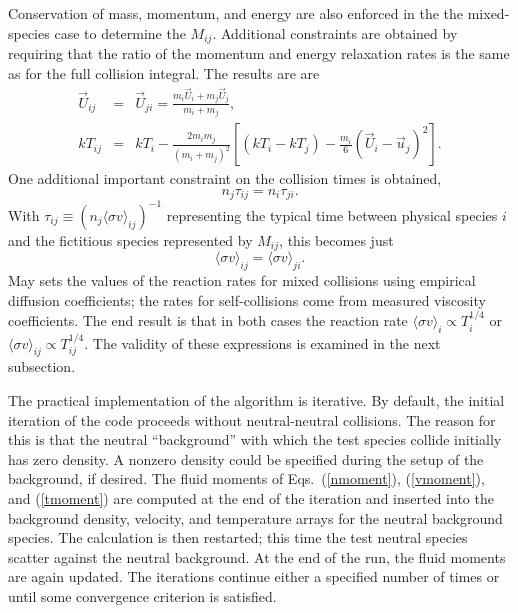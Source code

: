 \documentclass[12pt]{report}
\begin{document}
Conservation of mass, momentum, and energy are also enforced in the
the mixed-species case to determine the $M_{ij}$. Additional constraints
are obtained by requiring that the ratio of the momentum and energy
relaxation rates is the same as for the full collision integral.
The results are\cite{Mayxx,Reit97,Kanz99} are
\begin{eqnarray}
\vec{U}_{ij} & = & \vec{U}_{ji} = \frac{m_{i} \vec{U}_{i} + m_{j} \vec{U}_{j}}
{m_{i} + m_{j}}, \\
k T_{ij} & = & k T_{i}  - \frac{2 m_{i} m_{j}}{(m_{i} + m_{j})^{2}}
\left[ (k T_{i} - k T_{j} ) - \frac{m_{i}}{6} (\vec{U}_{i} - \vec{u}_{j})^{2}
\right].
\end{eqnarray}
One additional important constraint on the collision times is obtained,
\begin{equation}
n_{j} \tau_{ij} = n_{i} \tau_{ji}.
\end{equation}
With $\tau_{ij} \equiv (n_{j} \langle \sigma v \rangle_{ij})^{-1}$
representing the typical time between physical species $i$ and 
the fictitious species represented by $M_{ij}$,
this becomes just
\begin{equation}
\langle \sigma v \rangle_{ij} = \langle \sigma v \rangle_{ji}.
\label{sigvconstraint}
\end{equation}
May\cite{Mayxx,Reit97} sets the values of the reaction rates for
mixed collisions using empirical diffusion coefficients; 
the rates for self-collisions
come from measured viscosity coefficients. The end result is that
in both cases the reaction rate $\langle \sigma v \rangle_{i}
\propto T_{i}^{1/4}$ 
or $\langle \sigma v \rangle_{ij}
\propto T_{ij}^{1/4}$.  The validity of these expressions is examined in the 
next subsection.

The practical implementation of the algorithm is iterative. By default, the
initial iteration of the code proceeds without neutral-neutral collisions.
The reason for this is that the neutral ``background'' with which the 
test species collide initially has zero density. A nonzero density
could be specified during the setup of the background, if desired.
The fluid moments of Eqs.~(\ref{nmoment}), (\ref{vmoment}), and (\ref{tmoment})
are computed at the end of the iteration and inserted into the background
density, velocity, and temperature arrays for the neutral background 
species. The calculation is then restarted; this time the test neutral
species scatter against the neutral background. At the end of the run,
the fluid moments are again updated. The iterations continue either a
specified number of times or until some convergence criterion is
satisfied. 
\end{document}
